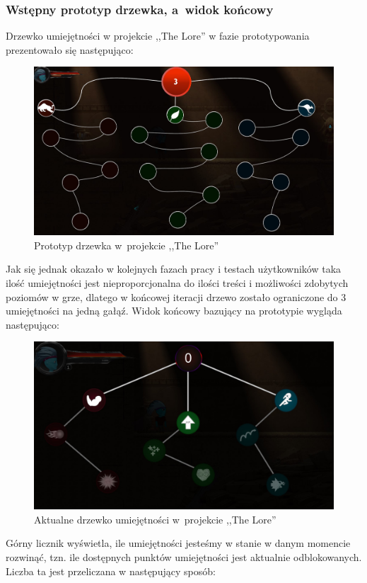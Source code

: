 \documentclass[oneside,polski,logo]{amuthesis}
\begin{document}
\subsubsection{Wstępny prototyp drzewka, a~widok końcowy}
Drzewko umiejętności w projekcie ,,The Lore'' w fazie prototypowania prezentowało się następująco:


\begin{figure}[h]
	\centering
	\includegraphics[width=13cm]{images/kozubal/drzewkoPrototyp.jpg}
	\caption{Prototyp drzewka w~projekcie ,,The Lore''}
\end{figure}

Jak się jednak okazało w kolejnych fazach pracy i testach użytkowników taka ilość umiejętności jest nieproporcjonalna do ilości treści i możliwości zdobytych poziomów w grze, dlatego w końcowej iteracji drzewo zostało ograniczone do 3 umiejętności na jedną gałąź. Widok końcowy bazujący na prototypie wygląda następująco:


\begin{figure}[h]
	\centering
	\includegraphics[width=13cm]{images/kozubal/drzewkoTheLore.jpg}
	\caption{Aktualne drzewko umiejętności w~projekcie ,,The Lore''}
\end{figure}
\newpage
Górny licznik wyświetla, ile umiejętności jesteśmy w stanie w danym momencie rozwinąć, tzn. ile dostępnych punktów umiejętności jest aktualnie odblokowanych. Liczba ta jest przeliczana w następujący sposób:
\end{document}
